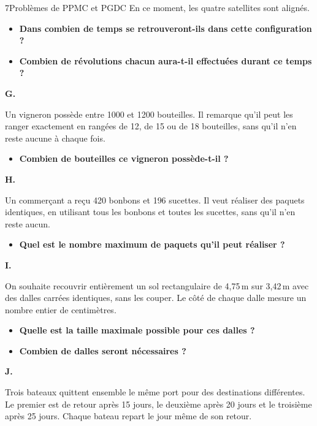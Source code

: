 \begin{exercice}{7}{Problèmes de PPMC et PGDC}
En ce moment, les quatre satellites sont alignés.

\begin{itemize}[label=$\blacktriangleright$]
\item \textbf{Dans combien de temps se retrouveront-ils dans cette configuration ?}
\item \textbf{Combien de révolutions chacun aura-t-il effectuées durant ce temps ?}
\end{itemize}

\bigskip\textbf{G.}

Un vigneron possède entre 1000 et 1200 bouteilles. Il remarque qu'il peut les ranger exactement en rangées de 12, de 15 ou de 18 bouteilles, sans qu'il n'en reste aucune à chaque fois.

\begin{itemize}[label=$\blacktriangleright$]
    \item \textbf{Combien de bouteilles ce vigneron possède-t-il ?}
\end{itemize}

\bigskip\textbf{H.}

\medskip
Un commerçant a reçu 420 bonbons et 196 sucettes. Il veut réaliser des paquets identiques, en utilisant tous les bonbons et toutes les sucettes, sans qu'il n'en reste aucun.

\begin{itemize}[label=$\blacktriangleright$]
    \item \textbf{Quel est le nombre maximum de paquets qu'il peut réaliser ?}
\end{itemize}

\bigskip\textbf{I.}

\medskip
On souhaite recouvrir entièrement un sol rectangulaire de 4,75\,m sur 3,42\,m avec des dalles carrées identiques, sans les couper.
Le côté de chaque dalle mesure un nombre entier de centimètres.

\begin{itemize}[label=$\blacktriangleright$]
    \item \textbf{Quelle est la taille maximale possible pour ces dalles ?}
    \item \textbf{Combien de dalles seront nécessaires ?}
\end{itemize}

\bigskip\textbf{J.}

\medskip
Trois bateaux quittent ensemble le même port pour des destinations différentes. Le premier est de retour après 15 jours, le deuxième après 20 jours et le troisième après 25 jours. Chaque bateau repart le jour même de son retour.


\end{exercice}
